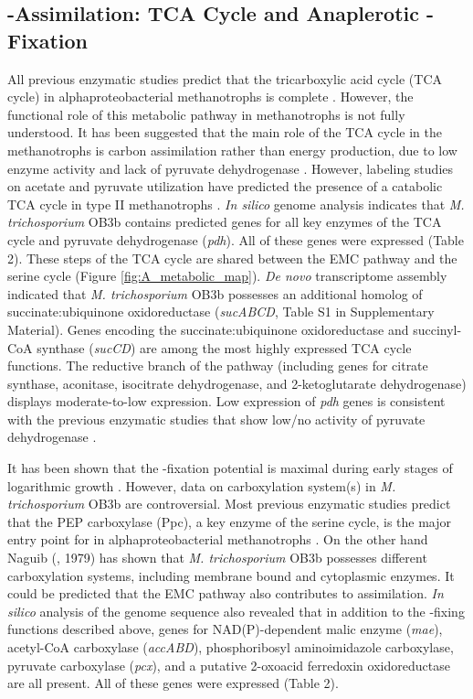 \subsection{-Assimilation: TCA Cycle and Anaplerotic -Fixation}
All previous enzymatic studies predict that the tricarboxylic acid cycle (TCA cycle) in alphaproteobacterial methanotrophs is complete \cite{trotsenko2008}.
However, the functional role of this metabolic pathway in methanotrophs is not fully understood.
It has been suggested that the main role of the TCA cycle in the methanotrophs is carbon assimilation rather than energy production, due to low enzyme activity and lack of pyruvate dehydrogenase \cite{trotsenko1976, anthony1982, shishkina1982, trotsenko2008}.
However, labeling studies on acetate and pyruvate utilization have predicted the presence of a catabolic TCA cycle in type II methanotrophs \cite{wadzinski1975, higgins1981}.
\textit{In silico} genome analysis indicates that \textit{M. trichosporium} OB3b contains predicted genes for all key enzymes of the TCA cycle and pyruvate dehydrogenase (\textit{pdh}).
All of these genes were expressed (Table 2).
These steps of the TCA cycle are shared between the EMC pathway and the serine cycle (Figure \ref{fig:A_metabolic_map}).
\textit{De novo} transcriptome assembly indicated that \textit{M. trichosporium} OB3b possesses an additional homolog of succinate:ubiquinone oxidoreductase (\textit{sucABCD}, Table S1 in Supplementary Material).
Genes encoding the succinate:ubiquinone oxidoreductase and succinyl-CoA synthase (\textit{sucCD}) are among the most highly expressed TCA cycle functions.
The reductive branch of the pathway (including genes for citrate synthase, aconitase, isocitrate dehydrogenase, and 2-ketoglutarate dehydrogenase) displays moderate-to-low expression.
Low expression of \textit{pdh} genes is consistent with the previous enzymatic studies that show low/no activity of pyruvate dehydrogenase \cite{trotsenko1976}.

It has been shown that the -fixation potential is maximal during early stages of logarithmic growth \cite{park1991, park1992}.
However, data on carboxylation system(s) in \textit{M. trichosporium} OB3b are controversial.
Most previous enzymatic studies predict that the PEP carboxylase (Ppc), a key enzyme of the serine cycle, is the major entry point for  in alphaproteobacterial methanotrophs \cite{shishkina1982}.
On the other hand Naguib (\cite{naguib1979}, 1979) has shown that \textit{M. trichosporium} OB3b possesses different carboxylation systems, including membrane bound and cytoplasmic enzymes.
It could be predicted that the EMC pathway also contributes to  assimilation.
\textit{In silico} analysis of the genome sequence also revealed that in addition to the -fixing functions described above, genes for NAD(P)-dependent malic enzyme (\textit{mae}), acetyl-CoA carboxylase (\textit{accABD}), phosphoribosyl aminoimidazole carboxylase, pyruvate carboxylase (\textit{pcx}), and a putative 2-oxoacid ferredoxin oxidoreductase are all present.
All of these genes were expressed (Table 2).

